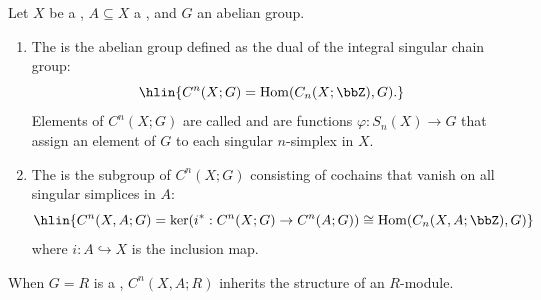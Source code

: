 \begin{definition} \label{definition:singular_cochain_group_of_a_topological_space_with_coefficients_in_an_abelian_group}
Let $X$ be a , $A \subseteq X$ a , and $G$ an abelian group. 

\begin{enumerate}
    \item The  is the abelian group defined as the dual of the integral singular chain group:
    $$\hlin{C^n(X; G) = \operatorname{Hom}(C_n(X; \bbZ), G).}$$
    Elements of $C^n(X; G)$ are called  and are functions $\varphi: S_n(X) \to G$ that assign an element of $G$ to each singular $n$-simplex in $X$.

    \item The  is the subgroup of $C^n(X; G)$ consisting of cochains that vanish on all singular simplices in $A$:
    $$\hlin{C^n(X, A; G) = \ker(i^*: C^n(X; G) \to C^n(A; G)) \cong \operatorname{Hom}(C_n(X, A; \bbZ), G)}$$
    where $i: A \hookrightarrow X$ is the inclusion map.
\end{enumerate}
When $G = R$ is a , $C^n(X, A; R)$ inherits the structure of an $R$-module.
\end{definition}